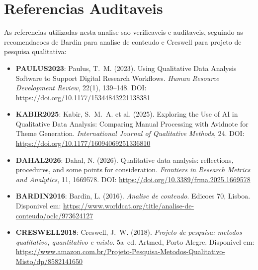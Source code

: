 \section{Referencias Auditaveis}
\label{sec:qc_referencias}

As referencias utilizadas nesta analise sao verificaveis e auditaveis, seguindo as recomendacoes de Bardin \cite{BARDIN2016} para analise de conteudo e Creswell \cite{CRESWELL2018} para projeto de pesquisa qualitativa:

\begin{itemize}
    \item \textbf{PAULUS2023}: Paulus, T.~M. (2023). Using Qualitative Data Analysis Software to Support Digital Research Workflows. \textit{Human Resource Development Review}, 22(1), 139--148. DOI: \url{https://doi.org/10.1177/15344843221138381}
    
    \item \textbf{KABIR2025}: Kabir, S.~M.~A. et al. (2025). Exploring the Use of AI in Qualitative Data Analysis: Comparing Manual Processing with Avidnote for Theme Generation. \textit{International Journal of Qualitative Methods}, 24. DOI: \url{https://doi.org/10.1177/16094069251336810}
    
    \item \textbf{DAHAL2026}: Dahal, N. (2026). Qualitative data analysis: reflections, procedures, and some points for consideration. \textit{Frontiers in Research Metrics and Analytics}, 11, 1669578. DOI: \url{https://doi.org/10.3389/frma.2025.1669578}
    
    \item \textbf{BARDIN2016}: Bardin, L. (2016). \textit{Analise de conteudo}. Edicoes 70, Lisboa. Disponivel em: \url{https://www.worldcat.org/title/analise-de-conteudo/oclc/973624127}
    
    \item \textbf{CRESWELL2018}: Creswell, J.~W. (2018). \textit{Projeto de pesquisa: metodos qualitativo, quantitativo e misto}. 5a~ed. Artmed, Porto Alegre. Disponivel em: \url{https://www.amazon.com.br/Projeto-Pesquisa-Metodos-Qualitativo-Misto/dp/8582141650}
\end{itemize}

